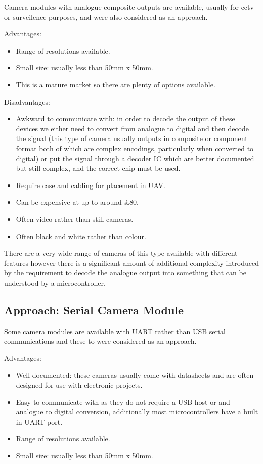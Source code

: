 Camera modules with analogue composite outputs are available, usually for cctv or surveilence purposes, and were also considered as an approach.

Advantages:
\begin{itemize}
	\item Range of resolutions available.
	\item Small size: usually less than 50mm x 50mm.
	\item This is a mature market so there are plenty of options available.
\end{itemize}

Disadvantages:
     \begin{itemize}
        \item Awkward to communicate with: in order to decode the output of these devices we either need to convert from analogue to digital and then decode the signal (this type of camera usually outputs in composite or component format both of which are complex encodings, particularly when converted to digital) or put the signal through a decoder IC which are better documented but still complex, and the correct chip must be used.
        \item Require case and cabling for placement in UAV.
		\item Can be expensive at up to around \pounds 80.
		\item Often video rather than still cameras.
		\item Often black and white rather than colour.
     \end{itemize}

There are a very wide range of cameras of this type available with different features however there is a significant amount of additional complexity introduced by the requirement to decode the analogue output into something that can be understood by a microcontroller.

\subsection{Approach: Serial Camera Module}
\label{sec:Serial_option}

Some camera modules are available with UART rather than USB serial communications and these to were considered as an approach.

Advantages:
      \begin{itemize}
      	 \item Well documented: these cameras usually come with datasheets and are often designed for use with electronic projects.
		 \item Easy to communicate with as they do not require a USB host or and analogue to digital conversion, additionally most microcontrollers have a built in UART port.
         \item Range of resolutions available.
		 \item Small size: usually less than 50mm x 50mm.
		 
     \end{itemize}

